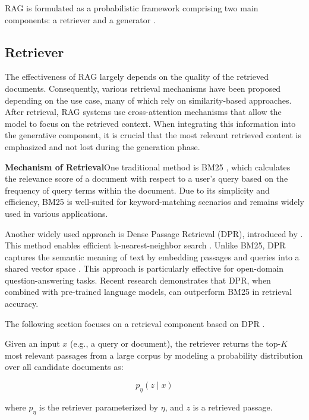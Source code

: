 \documentclass[%
    paper=A4,                    %
    twoside=true,               %
    openright,                  %
    parskip=full,               %
    chapterprefix=true,         %
    11pt,                       %
    headings=normal,            %
    bibliography=totoc,         %
    listof=totoc,              %
    titlepage=on,              %
    captions=tableabove,        %
    draft=false,               %
]{scrreprt}%
\begin{document}
RAG is formulated as a probabilistic framework comprising two main components: a retriever and a generator \cite{lewis2020retrieval}.

\subsection{Retriever}

The effectiveness of RAG largely depends on the quality of the retrieved documents. Consequently, various retrieval mechanisms have been proposed depending on the use case, many of which rely on similarity-based approaches.
After retrieval, RAG systems use cross-attention mechanisms that allow the model to focus on the retrieved context. When integrating this information into the generative component, it is crucial that the most relevant retrieved content is emphasized and not lost during the generation phase.




\textbf{Mechanism of Retrieval}\hspace{0.5em}One traditional method is BM25 \cite{robertson2009probabilistic}, which calculates the relevance score of a document with respect to a user's query based on the frequency of query terms within the document. Due to its simplicity and efficiency, BM25 is well-suited for keyword-matching scenarios and remains widely used in various applications.

Another widely used approach is Dense Passage Retrieval (DPR), introduced by \cite{karpukhin2020dense}. This method enables efficient k-nearest-neighbor search \cite{xiong2020approximate}. Unlike BM25, DPR captures the semantic meaning of text by embedding passages and queries into a shared vector space \cite{gupta2024comprehensive}. This approach is particularly effective for open-domain question-answering tasks. Recent research \cite{li2023making} demonstrates that DPR, when combined with pre-trained language models, can outperform BM25 in retrieval accuracy.


The following section focuses on a retrieval component based on DPR \cite{lewis2020retrieval}.

Given an input \( x \) (e.g., a query or document), the retriever returns the top-\( K \) most relevant passages from a large corpus by modeling a probability distribution over all candidate documents as:

\[
p_{\eta}(z \mid x)
\]

where \( p_{\eta} \) is the retriever parameterized by \( \eta \), and \( z \) is a retrieved passage.
\end{document}
